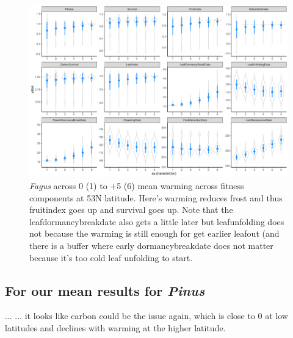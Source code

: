 \documentclass[11pt,letter]{article}
\begin{document}
\begin{figure} 
 \begin{center}
\noindent \includegraphics[width=1\textwidth]{..//analyses/graphs/phenofit/sims/meansim53_allmetricsFS.pdf}
  \caption{\emph{Fagus} across 0 (1) to $+$5 (6) mean warming across fitness components at 53\degree N latitude. Here's warming reduces frost and thus fruitindex goes up and survival goes up. Note that the leafdormancybreakdate also gets a little later but leafunfolding does not because the warming is still enough for get earlier leafout (and there is a buffer where early dormancybreakdate does not matter because it's too cold leaf unfolding to start. }
  \label{fig:fagusmean53}
  \end{center}
\end{figure}

\clearpage
\subsection{For our mean results for  \emph{Pinus}}...
... it looks like carbon could be the issue again, which is close to 0 at low latitudes and declines with warming at the higher latitude. 
\end{document}
